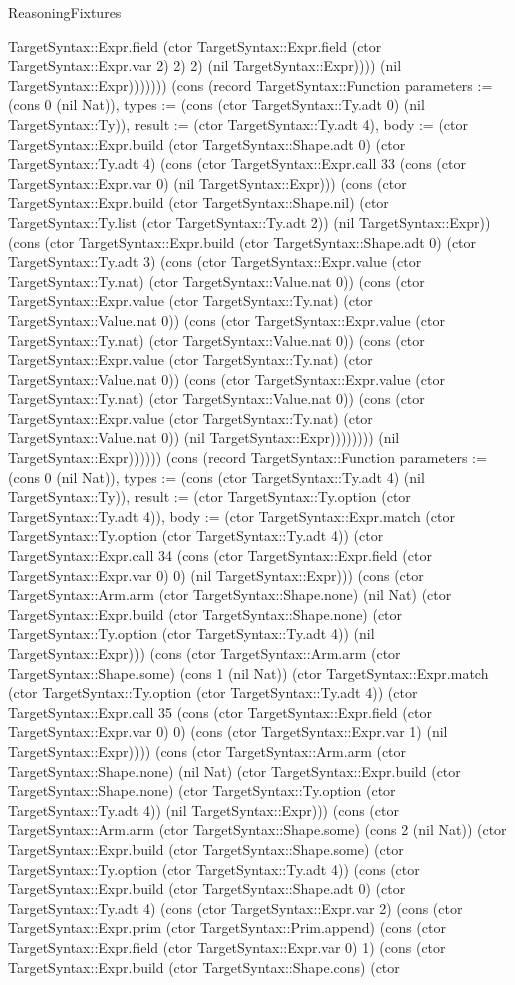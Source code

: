 \begin{lexlean}{ReasoningFixtures}
\begin{semanticmodule}
{TargetSyntax::Expr.field (ctor TargetSyntax::Expr.field (ctor TargetSyntax::Expr.var 2) 2) 2) (nil TargetSyntax::Expr)))) (nil TargetSyntax::Expr))))))}) (cons (record TargetSyntax::Function {parameters := (cons 0 (nil Nat)), types := (cons (ctor TargetSyntax::Ty.adt 0) (nil TargetSyntax::Ty)), result := (ctor TargetSyntax::Ty.adt 4), body := (ctor TargetSyntax::Expr.build (ctor TargetSyntax::Shape.adt 0) (ctor TargetSyntax::Ty.adt 4) (cons (ctor TargetSyntax::Expr.call 33 (cons (ctor TargetSyntax::Expr.var 0) (nil TargetSyntax::Expr))) (cons (ctor TargetSyntax::Expr.build (ctor TargetSyntax::Shape.nil) (ctor TargetSyntax::Ty.list (ctor TargetSyntax::Ty.adt 2)) (nil TargetSyntax::Expr)) (cons (ctor TargetSyntax::Expr.build (ctor TargetSyntax::Shape.adt 0) (ctor TargetSyntax::Ty.adt 3) (cons (ctor TargetSyntax::Expr.value (ctor TargetSyntax::Ty.nat) (ctor TargetSyntax::Value.nat 0)) (cons (ctor TargetSyntax::Expr.value (ctor TargetSyntax::Ty.nat) (ctor TargetSyntax::Value.nat 0)) (cons (ctor TargetSyntax::Expr.value (ctor TargetSyntax::Ty.nat) (ctor TargetSyntax::Value.nat 0)) (cons (ctor TargetSyntax::Expr.value (ctor TargetSyntax::Ty.nat) (ctor TargetSyntax::Value.nat 0)) (cons (ctor TargetSyntax::Expr.value (ctor TargetSyntax::Ty.nat) (ctor TargetSyntax::Value.nat 0)) (cons (ctor TargetSyntax::Expr.value (ctor TargetSyntax::Ty.nat) (ctor TargetSyntax::Value.nat 0)) (nil TargetSyntax::Expr)))))))) (nil TargetSyntax::Expr)))))}) (cons (record TargetSyntax::Function {parameters := (cons 0 (nil Nat)), types := (cons (ctor TargetSyntax::Ty.adt 4) (nil TargetSyntax::Ty)), result := (ctor TargetSyntax::Ty.option (ctor TargetSyntax::Ty.adt 4)), body := (ctor TargetSyntax::Expr.match (ctor TargetSyntax::Ty.option (ctor TargetSyntax::Ty.adt 4)) (ctor TargetSyntax::Expr.call 34 (cons (ctor TargetSyntax::Expr.field (ctor TargetSyntax::Expr.var 0) 0) (nil TargetSyntax::Expr))) (cons (ctor TargetSyntax::Arm.arm (ctor TargetSyntax::Shape.none) (nil Nat) (ctor TargetSyntax::Expr.build (ctor TargetSyntax::Shape.none) (ctor TargetSyntax::Ty.option (ctor TargetSyntax::Ty.adt 4)) (nil TargetSyntax::Expr))) (cons (ctor TargetSyntax::Arm.arm (ctor TargetSyntax::Shape.some) (cons 1 (nil Nat)) (ctor TargetSyntax::Expr.match (ctor TargetSyntax::Ty.option (ctor TargetSyntax::Ty.adt 4)) (ctor TargetSyntax::Expr.call 35 (cons (ctor TargetSyntax::Expr.field (ctor TargetSyntax::Expr.var 0) 0) (cons (ctor TargetSyntax::Expr.var 1) (nil TargetSyntax::Expr)))) (cons (ctor TargetSyntax::Arm.arm (ctor TargetSyntax::Shape.none) (nil Nat) (ctor TargetSyntax::Expr.build (ctor TargetSyntax::Shape.none) (ctor TargetSyntax::Ty.option (ctor TargetSyntax::Ty.adt 4)) (nil TargetSyntax::Expr))) (cons (ctor TargetSyntax::Arm.arm (ctor TargetSyntax::Shape.some) (cons 2 (nil Nat)) (ctor TargetSyntax::Expr.build (ctor TargetSyntax::Shape.some) (ctor TargetSyntax::Ty.option (ctor TargetSyntax::Ty.adt 4)) (cons (ctor TargetSyntax::Expr.build (ctor TargetSyntax::Shape.adt 0) (ctor TargetSyntax::Ty.adt 4) (cons (ctor TargetSyntax::Expr.var 2) (cons (ctor TargetSyntax::Expr.prim (ctor TargetSyntax::Prim.append) (cons (ctor TargetSyntax::Expr.field (ctor TargetSyntax::Expr.var 0) 1) (cons (ctor TargetSyntax::Expr.build (ctor TargetSyntax::Shape.cons) (ctor }
\end{semanticmodule}
\end{lexlean}
